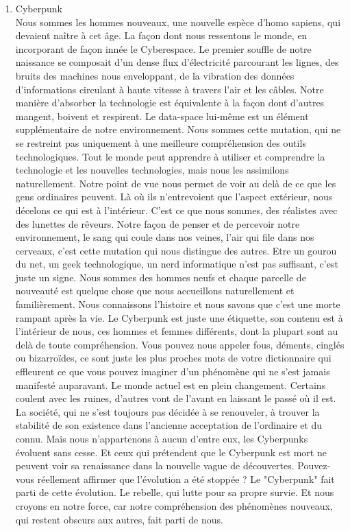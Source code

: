 \documentclass[11pt,twoside,a4paper]{book}
\begin{document}
\begin{enumerate}
		\setlength{\itemsep}{1pt}
		\setlength{\parskip}{0pt}
		\setlength{\parsep}{0pt}
		
	\item[I.] Cyberpunk ~\\
		Nous sommes les hommes nouveaux, une nouvelle esp{\`e}ce d'homo sapiens, qui devaient na{\^i}tre {\`a} cet {\^a}ge. La fa\c{c}on dont nous ressentons le monde, en incorporant de fa\c{c}on inn{\'e}e le Cyberespace. Le premier souffle de notre naissance se composait d'un dense flux d'{\'e}lectricit{\'e} parcourant les lignes, des bruits des machines nous enveloppant, de la vibration des donn{\'e}es d'informations circulant {\`a} haute vitesse {\`a} travers l'air et les c{\^a}bles. Notre mani{\`e}re d'absorber la technologie est {\'e}quivalente {\`a} la fa\c{c}on dont d'autres mangent, boivent et respirent. Le data-space lui-m{\^e}me est un {\'e}l{\'e}ment suppl{\'e}mentaire de notre environnement. Nous sommes cette mutation, qui ne se restreint pas uniquement {\`a} une meilleure compr{\'e}hension des outils technologiques. Tout le monde peut apprendre {\`a} utiliser et comprendre la technologie et les nouvelles technologies, mais nous les assimilons naturellement. Notre point de vue nous permet de voir au del{\`a} de ce que les gens ordinaires peuvent. L{\`a} o{\`u} ils n'entrevoient que l'aspect ext{\'e}rieur, nous d{\'e}celons ce qui est {\`a} l'int{\'e}rieur. C'est ce que nous sommes, des r{\'e}alistes avec des lunettes de r{\^e}veurs. Notre fa\c{c}on de penser et de percevoir notre environnement, le sang qui coule dans nos veines, l'air qui file dans nos cerveaux, c'est cette mutation qui nous distingue des autres. Etre un gourou du net, un geek technologique, un nerd informatique n'est pas suffisant, c'est juste un signe. Nous sommes des hommes neufs et chaque parcelle de nouveaut{\'e} est quelque chose que nous accueillons naturellement et famili{\`e}rement. Nous connaissons l'histoire et nous savons que c'est une morte rampant apr{\`e}s la vie. Le Cyberpunk est juste une {\'e}tiquette, son contenu est {\`a} l'int{\'e}rieur de nous, ces hommes et femmes diff{\'e}rents, dont la plupart sont au del{\`a} de toute compr{\'e}hension. Vous pouvez nous appeler fous, d{\'e}ments, cingl{\'e}s ou bizarro{\"i}des, ce sont juste les plus proches mots de votre dictionnaire qui effleurent ce que vous pouvez imaginer d'un ph{\'e}nom{\`e}ne qui ne s'est jamais manifest{\'e} auparavant. Le monde actuel est en plein changement. Certains coulent avec les ruines, d'autres vont de l'avant en laissant le pass{\'e} o{\`u} il est. La soci{\'e}t{\'e}, qui ne s'est toujours pas d{\'e}cid{\'e}e {\`a} se renouveler, {\`a} trouver la stabilit{\'e} de son existence dans l'ancienne acceptation de l'ordinaire et du connu. Mais nous n'appartenons {\`a} aucun d'entre eux, les Cyberpunks {\'e}voluent sans cesse. Et ceux qui pr{\'e}tendent que le Cyberpunk est mort ne peuvent voir sa renaissance dans la nouvelle vague de d{\'e}couvertes. Pouvez-vous r{\'e}ellement affirmer que l'{\'e}volution a {\'e}t{\'e} stopp{\'e}e ? Le "Cyberpunk" fait parti de cette {\'e}volution. Le rebelle, qui lutte pour sa propre survie. Et nous croyons en notre force, car notre compr{\'e}hension des ph{\'e}nom{\`e}nes nouveaux, qui restent obscurs aux autres, fait parti de nous.

\end{enumerate}
\end{document}

